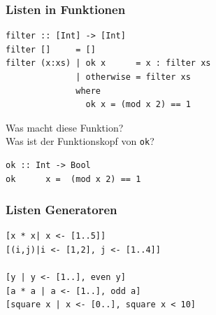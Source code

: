 \documentclass[fleqn,11pt,aspectratio=43]{beamer}
\begin{document}
\begin{frame}[fragile]
\frametitle{Listen in Funktionen}
\begin{lstlisting}
filter :: [Int] -> [Int]
filter []     = []
filter (x:xs) | ok x      = x : filter xs
              | otherwise = filter xs
              where
                ok x = (mod x 2) == 1
\end{lstlisting}
\vspace*{-1ex}
\begin{block}{\vspace*{-3ex}}
Was macht diese Funktion?\\
Was ist der Funktionskopf von \lstinline|ok|?\\
\end{block}
\pause
\begin{lstlisting}
ok :: Int -> Bool
ok      x =  (mod x 2) == 1
\end{lstlisting}
\end{frame}


\begin{frame}[fragile]
\frametitle{Listen Generatoren}
\begin{lstlisting}
[x * x| x <- [1..5]]
[(i,j)|i <- [1,2], j <- [1..4]]

[y | y <- [1..], even y]
[a * a | a <- [1..], odd a]
[square x | x <- [0..], square x < 10]
\end{lstlisting}
\begin{block}{\vspace*{-3ex}}
\begin{center}
\scalebox{0.7}{}
\end{center}
\end{block}
\end{frame}
\end{document}
